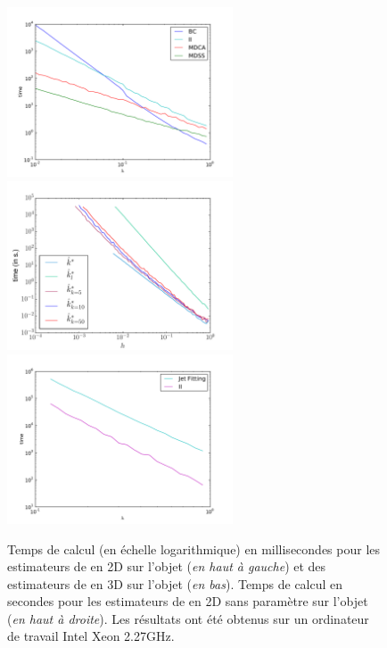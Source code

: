 \begin{figure}[ht]
  \begin{center}
    \includegraphics[width=6.7cm]{graphs/Timing2D}
    \includegraphics[width=6.7cm]{graphs/Timing2D_PF}\\
    \includegraphics[width=6.7cm]{graphs/Timing3D}
    \caption{
      Temps de calcul (en échelle logarithmique) en millisecondes pour les
      estimateurs de  en 2D sur l'objet \Flower (\emph{en haut à gauche})
      et des estimateurs de  en 3D sur l'objet \RoundedCube
      (\emph{en bas}). Temps de calcul en secondes pour les estimateurs de
       en 2D sans paramètre sur l'objet \Ellipse (\emph{en haut à droite}).
      Les résultats ont été obtenus sur un ordinateur de travail Intel Xeon
      2.27GHz.
      }
      \label{fig:curv-experiments-timings}
  \end{center}
\end{figure}

